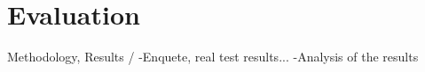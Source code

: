 \section*{Evaluation}
{ Methodology, Results } / 
-Enquete, real test results...
-Analysis of the results